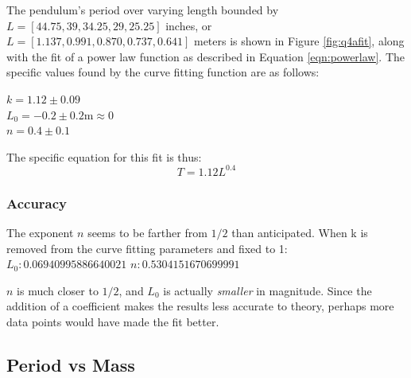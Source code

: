 \documentclass[12pt]{article}
\begin{document}
The pendulum's period over varying length bounded by $L = [44.75, 39, 34.25, 29, 25.25]$ inches, or\\
$L=[1.137, 0.991, 0.870, 0.737, 0.641]$ meters is shown in Figure \ref{fig:q4afit}, along with the fit of a power law function as described in Equation \ref{eqn:powerlaw}.
The specific values found by the curve fitting function are as follows:
\begin{center}
    $
    k= 1.12 \pm 0.09
    $\\
    $
    L_0= -0.2 \pm 0.2 \text{m}\approx 0$\\
    $
    n= 0.4 \pm 0.1
    $
\end{center}
The specific equation for this fit is thus:
\begin{equation}
    T = 1.12L^{0.4}
\end{equation}

\subsubsection{Accuracy}

The exponent $n$ seems to be farther from $1/2$ than anticipated. When k is removed from the curve fitting parameters and fixed to 1:\\
$L_0: 0.06940995886640021$
$n: 0.5304151670699991$

$n$ is much closer to $1/2$, and $L_0$ is actually \emph{smaller} in magnitude. Since the addition of a coefficient makes the results less accurate to theory, perhaps more data points would have made the fit better.

\subsection{Period vs Mass}
\label{section:q4b}
\end{document}
